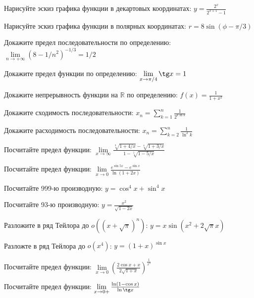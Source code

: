 \documentclass[russian]{article}
\begin{document}
 
Нарисуйте эскиз графика функции в декартовых координатах:
$y = \frac{2^x}{2^{x + 1} - 1}$

Нарисуйте эскиз графика функции в полярных координатах:
$r = 8\sin(\phi - \pi/3)$

Докажите предел последовательности по определению:
$\lim\limits_{n \to +\infty} (8 - 1/n^2)^{-1/3} = 1/2$

Докажите предел функции по определению:
$\lim\limits_{x \to \pi/4} \tg x = 1$

Докажите непрерывность функции на $\mathbb{R}$ по определению:
$f(x) = \frac{1}{1 + x^2}$

Докажите сходимость последовательности:
$x_n = \sum_{k = 1}^n \frac{1}{2^{k \ln k}}$

Докажите расходимость последовательности:
$x_n = \sum_{k = 2}^n \frac{1}{\ln^2 k}$

Посчитайте предел функции:
$\lim\limits_{x \to \infty} \frac{\sqrt[3]{1 + 4/x} - \sqrt[4]{1 + 3/x}}{1 - \sqrt[5]{1 - 5/x}}$

Посчитайте предел функции:
$\lim\limits_{x \to 0} \frac{e^{\sin 5x} - e^{\sin x}}{\ln(1 + 2x)}$

Посчитайте 999-ю производную:
$y = \cos^4 x + \sin^4 x$

Посчитайте 93-ю производную:
$y = \frac{x^2}{\sqrt{1 - 2x}}$

Разложите в ряд Тейлора до $o((x + \sqrt{\pi})^n)$:
$y = x\sin(x^2 + 2\sqrt{\pi} x)$

Разложте в ряд Тейлора до $o(x^4)$:
$y = (1 + x)^{\sin x}$

Посчитайте предел функции:
$\lim\limits_{x \to 0} \left( \frac{2\cos x + x}{2 \sqrt{1 + x}} \right)^\frac{1}{x^2}$

Посчитайте предел функции:
$\lim\limits_{x \to 0+} \frac{\ln(1 - \cos x)}{\ln \tg x}$
\end{document}
